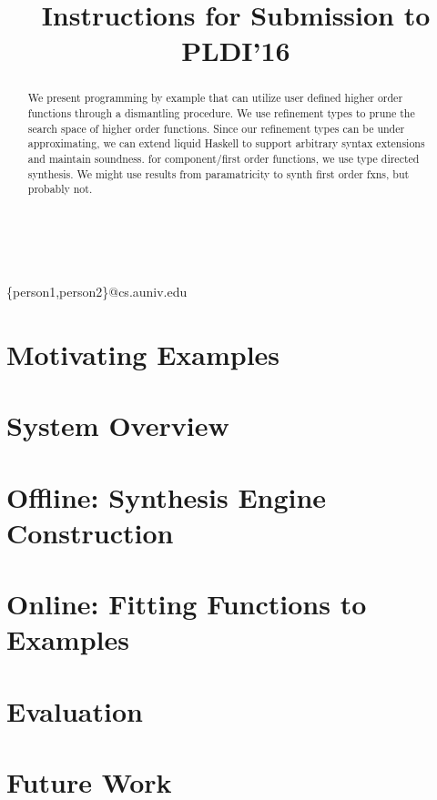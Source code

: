 \documentclass[pldi]{sigplanconf-pldi16}
\begin{document}
\title{Instructions for Submission to PLDI'16}

%
%

{ \\
  \\
}
{\{person1,person2\}@cs.auniv.edu}

\maketitle

\begin{abstract}
  We present programming by example that can utilize user defined higher order functions through a dismantling procedure.
  We use refinement types to prune the search space of higher order functions.
  Since our refinement types can be under approximating, we can extend liquid Haskell to support arbitrary syntax extensions and maintain soundness.
  for component/first order functions, we use type directed synthesis.
  We might use results from paramatricity to synth first order fxns, but probably not.
\end{abstract}


\section{Motivating Examples}


\section{System Overview}


\section{Offline: Synthesis Engine Construction}


\section{Online: Fitting Functions to Examples}


\section{Evaluation}

\section{Future Work}



\end{document}

